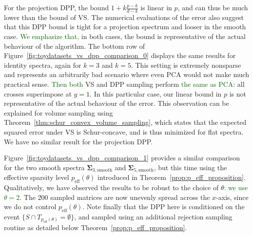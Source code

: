 \documentclass[twoside,11pt]{book}
\newcommand{\rev}[1]{\textcolor{darkgreen}{#1}}
\numberwithin{theorem}{chapter}
\numberwithin{definition}{chapter}
\numberwithin{proposition}{chapter}
\numberwithin{corollary}{chapter}
\numberwithin{example}{chapter}
\numberwithin{lemma}{chapter}
\numberwithin{assumption}{chapter}
\DeclareMathOperator{\eff}{\mathrm{eff}}
\begin{document}
For the projection DPP, the bound $1+k\frac{p-k}{d-k}$ is linear in $p$, and can thus be much lower than the bound of VS. The numerical evaluations of the error also suggest that this DPP bound is tight for a projection spectrum and looser in the smooth case. \rev{We emphasize that,} in both cases, the bound is representative of the actual behaviour of the algorithm.
The bottom row of Figure~\ref{fig:toydatasets_vs_dpp_comparison_0} displays the same results for identity spectra, again for $k=3$ and $k=5$. This setting is extremely nonsparse and represents an arbitrarily bad scenario where even PCA would not make much practical sense. \rev{Then both} VS and DPP sampling perform \rev{the same as PCA}: all crosses superimpose at $y=1$. In this particular case, our linear bound in $p$ is not representative of the actual behaviour of the error. This observation can be explained for volume sampling using Theorem~\ref{thm:schur_convex_volume_sampling}, which states that the expected squared error under VS is Schur-concave, and is thus minimized for flat spectra. We have no similar result for the projection DPP.

Figure~\ref{fig:toydatasets_vs_dpp_comparison_1} provides a similar comparison for the two smooth spectra $\bm{\Sigma}_{3,\text{smooth}}$ and $\bm{\Sigma}_{5,\text{smooth}}$, but this time using the effective sparsity level $p_{\eff}(\theta)$ introduced in Theorem~\ref{prop:p_eff_proposition}. Qualitatively, we have observed the results to be robust to the choice of $\theta$\rev{: we use $\theta=2$}. The $200$ sampled matrices are now unevenly spread across the $x$-axis, since we do not control $p_{\eff}(\theta)$. Note finally that the DPP here is conditioned on the event $\{S \cap T_{p_{\mathrm{eff}}(\theta)}=\emptyset\}$, and sampled using an additional rejection sampling routine as detailed below Theorem~\ref{prop:p_eff_proposition}.
\end{document}
